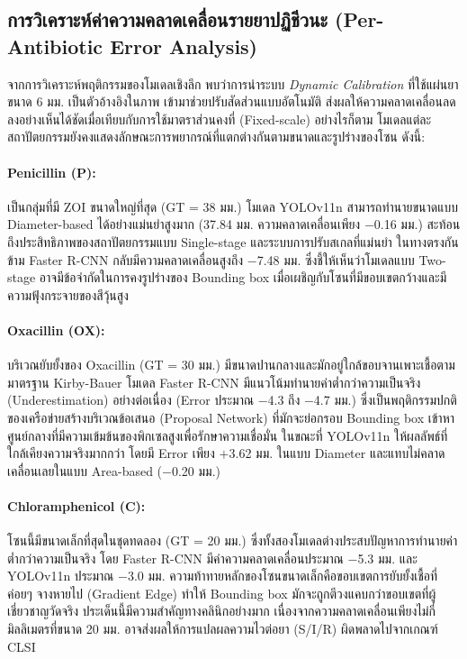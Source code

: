 \subsection{การวิเคราะห์ค่าความคลาดเคลื่อนรายยาปฏิชีวนะ (Per-Antibiotic Error Analysis)}

จากการวิเคราะห์พฤติกรรมของโมเดลเชิงลึก พบว่าการนำระบบ \emph{Dynamic Calibration} ที่ใช้แผ่นยาขนาด 6 มม. เป็นตัวอ้างอิงในภาพ เข้ามาช่วยปรับสัดส่วนแบบอัตโนมัติ ส่งผลให้ความคลาดเคลื่อนลดลงอย่างเห็นได้ชัดเมื่อเทียบกับการใช้มาตราส่วนคงที่ (Fixed-scale) อย่างไรก็ตาม โมเดลแต่ละสถาปัตยกรรมยังคงแสดงลักษณะการพยากรณ์ที่แตกต่างกันตามขนาดและรูปร่างของโซน ดังนี้:

\paragraph{Penicillin (P):}
เป็นกลุ่มที่มี ZOI ขนาดใหญ่ที่สุด (GT = 38 มม.) โมเดล YOLOv11n สามารถทำนายขนาดแบบ Diameter-based ได้อย่างแม่นยำสูงมาก (37.84 มม. ความคลาดเคลื่อนเพียง $-$0.16 มม.) สะท้อนถึงประสิทธิภาพของสถาปัตยกรรมแบบ Single-stage และระบบการปรับสเกลที่แม่นยำ ในทางตรงกันข้าม Faster R-CNN กลับมีความคลาดเคลื่อนสูงถึง $-$7.48 มม. ซึ่งชี้ให้เห็นว่าโมเดลแบบ Two-stage อาจมีข้อจำกัดในการคงรูปร่างของ Bounding box เมื่อเผชิญกับโซนที่มีขอบเขตกว้างและมีความฟุ้งกระจายของสีวุ้นสูง

\paragraph{Oxacillin (OX):}
บริเวณยับยั้งของ Oxacillin (GT = 30 มม.) มีขนาดปานกลางและมักอยู่ใกล้ขอบจานเพาะเชื้อตามมาตรฐาน Kirby-Bauer โมเดล Faster R-CNN มีแนวโน้มทำนายค่าต่ำกว่าความเป็นจริง (Underestimation) อย่างต่อเนื่อง (Error ประมาณ $-$4.3 ถึง $-$4.7 มม.) ซึ่งเป็นพฤติกรรมปกติของเครือข่ายสร้างบริเวณข้อเสนอ (Proposal Network) ที่มักจะย่อกรอบ Bounding box เข้าหาศูนย์กลางที่มีความเข้มข้นของพิกเซลสูงเพื่อรักษาความเชื่อมั่น ในขณะที่ YOLOv11n ให้ผลลัพธ์ที่ใกล้เคียงความจริงมากกว่า โดยมี Error เพียง $+$3.62 มม. ในแบบ Diameter และแทบไม่คลาดเคลื่อนเลยในแบบ Area-based ($-$0.20 มม.)

\paragraph{Chloramphenicol (C):}
โซนนี้มีขนาดเล็กที่สุดในชุดทดลอง (GT = 20 มม.) ซึ่งทั้งสองโมเดลต่างประสบปัญหาการทำนายค่าต่ำกว่าความเป็นจริง โดย Faster R-CNN มีค่าความคลาดเคลื่อนประมาณ $-$5.3 มม. และ YOLOv11n ประมาณ $-$3.0 มม. ความท้าทายหลักของโซนขนาดเล็กคือขอบเขตการยับยั้งเชื้อที่ค่อยๆ จางหายไป (Gradient Edge) ทำให้ Bounding box มักจะถูกตีวงแคบกว่าขอบเขตที่ผู้เชี่ยวชาญวัดจริง ประเด็นนี้มีความสำคัญทางคลินิกอย่างมาก เนื่องจากความคลาดเคลื่อนเพียงไม่กี่มิลลิเมตรที่ขนาด 20 มม. อาจส่งผลให้การแปลผลความไวต่อยา (S/I/R) ผิดพลาดไปจากเกณฑ์ CLSI \cite{clsi2025}

